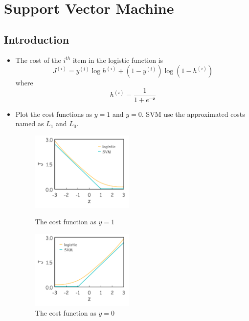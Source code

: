\chapter{Support Vector Machine}


\section{Introduction}
\begin{itemize}
    \item The cost of the $i^{th}$ item in the logistic function is
    \begin{equation} J^{(i)} = y^{(i)} \log{h^{(i)}} + (1-y^{(i)}) \log{(1-h^{(i)})} \end{equation}
    where
    \begin{equation} h^{(i)} = \frac{1}{1+e^{-\mathbf{z}}} \end{equation}
    
    \item Plot the cost functions as $y=1$ and $y=0$. SVM use the approximated costs named as $L_1$ and $L_0$.
    \begin{figure}[!htbp]
        \begin{minipage}[t]{0.5\textwidth}
            \centering
            \includegraphics[width=2.0in]{./images/supportVectorMachineY1.png}
            \caption{The cost function as $y=1$}
        \end{minipage}
        \begin{minipage}[t]{0.45\textwidth}
            \centering
            \includegraphics[width=2.0in]{./images/supportVectorMachineY0.png}
            \caption{The cost function as $y=0$}
        \end{minipage}
    \end{figure}
\end{itemize}


